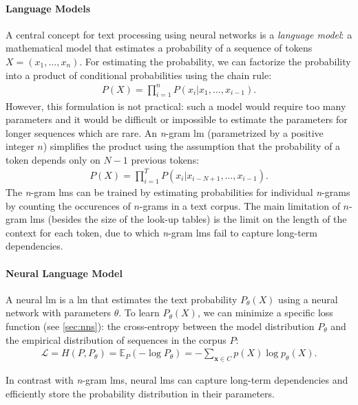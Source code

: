 {\paragraph{Language Models} A central concept for text processing using neural networks is a \emph{language model}: a mathematical model that estimates a probability of a sequence of tokens $X = (x_1, \ldots, x_n)$. For estimating the probability, we can factorize the probability into a product of conditional probabilities using the chain rule:
\begin{align}
  P(X) = \prod_{i=1}^n P(x_i|x_1, \hdots, x_{i-1}).
\end{align}
However, this formulation is not practical: such a model would require too many parameters and it would be difficult or impossible to estimate the parameters for longer sequences which are rare. An \emph{n}-gram \ac{lm} (parametrized by a positive integer $n$) simplifies the product using the assumption that the probability of a token depends only on $N-1$ previous tokens:
\begin{align}
  P(X) = \prod_{i=1}^T P(x_i|x_{i-N+1}, \hdots,x_{i-1}).
\end{align}
The \emph{n}-gram \acp{lm} can be trained by estimating probabilities for individual \emph{n}-grams by counting the occurences of $n$-grams in a text corpus. The main limitation of $n$-gram \acp{lm} (besides the size of the look-up tables) is the limit on the length of the context for each token, due to which \emph{n}-gram \acp{lm} fail to capture long-term dependencies.




\paragraph{Neural Language Model} A neural \ac{lm} is a \acl{lm} that estimates the text probability $P_\theta(X)$ using a neural network with parameters $\theta$. To learn $P_\theta(X)$, we can minimize a specific loss function (see \autoref{sec:nns}): the cross-entropy between the model distribution $P_\theta$ and the empirical distribution of sequences in the corpus $P$:
\begin{align}
  \mathcal{L} = H(P,P_\theta) = \mathbb{E}_P(-\log P_\theta) = -\sum_{\mathbf{x}\in C}p(X)\log p_{\theta}(X).
\end{align}

In contrast with \emph{n}-gram \acp{lm}, neural \acp{lm} can capture long-term dependencies and efficiently store the probability distribution in their parameters.

}
